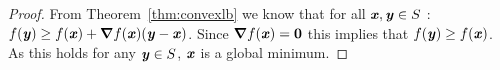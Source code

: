 \begin{proof}
From Theorem~\ref{thm:convexlb} we know that for all $\xx,\yy \in S$ : $f(\yy) \geq f(\xx) + \grad f(\xx)(\yy - \xx)$.
Since $\grad f(\xx) = \veczero$ this implies that $f(\yy) \geq
f(\xx)$.  As this holds for any $\yy \in S$, $\xx$ is a global
minimum.

%
\end{proof}






